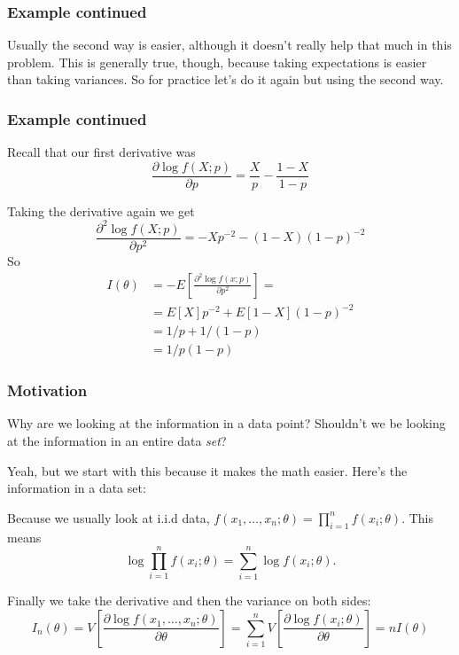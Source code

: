 \documentclass{beamer}
\begin{document}
\begin{frame}
\frametitle{Example continued}

Usually the second way is easier, although it doesn't really help that much in this problem. This is generally true, though, because taking expectations is easier than taking variances. So for practice let's do it again but using the second way.
\newline


\end{frame}


\begin{frame}
\frametitle{Example continued}

Recall that our first derivative was
\[
\frac{\partial \log f(X;p)}{\partial p} = \frac{X}{p} - \frac{1-X}{1-p}
\]

Taking the derivative again we get 
\[
\frac{\partial^2 \log f(X;p)}{\partial p^2} = -X p^{-2} - (1-X)(1-p)^{-2}
\]
So
\begin{align*}
I(\theta) &= -E\left[\frac{\partial^2 \log f(x;p)}{\partial p^2}\right] = \\
&= E[X] p^{-2} + E[1-X](1-p)^{-2} \\
&= 1/p + 1/(1-p) \\
&= 1/p(1-p)
\end{align*}

\end{frame}


\begin{frame}
\frametitle{Motivation}

Why are we looking at the information in a data point? Shouldn't we be looking at the information in an entire data \emph{set}?
\newline
\pause

Yeah, but we start with this because it makes the math easier. Here's the information in a data set:
\newline

Because we usually look at i.i.d data, $f(x_1, \ldots, x_n;\theta) = \prod_{i=1}^n f(x_i;\theta)$. This means 
\[
\log \prod_{i=1}^n f(x_i;\theta) = \sum_{i=1}^n \log f(x_i;\theta).
\]
\pause

Finally we take the derivative and then the variance on both sides:
\[
I_n(\theta) = V\left[ \frac{\partial \log f(x_1, \ldots, x_n;\theta)}{\partial \theta} \right] = \sum_{i=1}^n V\left[ \frac{\partial \log f(x_i;\theta)}{\partial \theta}\right] = nI(\theta)
\]

\end{frame}
\end{document}

